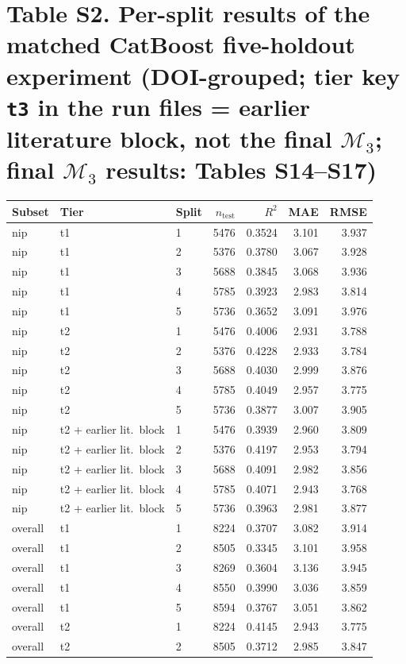 \documentclass[10pt]{article}
\begin{document}
\section*{Table S2. Per-split results of the matched CatBoost five-holdout experiment (DOI-grouped; tier key \texttt{t3} in the run files = earlier literature block, not the final $\mathcal{M}_3$; final $\mathcal{M}_3$ results: Tables S14--S17)}\begin{longtable}{lllrrrr}\toprule Subset & Tier & Split & $n_\mathrm{test}$ & $R^2$ & MAE & RMSE\\\midrule\endhead
nip & t1 & 1 & 5476 & 0.3524 & 3.101 & 3.937\\
nip & t1 & 2 & 5376 & 0.3780 & 3.067 & 3.928\\
nip & t1 & 3 & 5688 & 0.3845 & 3.068 & 3.936\\
nip & t1 & 4 & 5785 & 0.3923 & 2.983 & 3.814\\
nip & t1 & 5 & 5736 & 0.3652 & 3.091 & 3.976\\
nip & t2 & 1 & 5476 & 0.4006 & 2.931 & 3.788\\
nip & t2 & 2 & 5376 & 0.4228 & 2.933 & 3.784\\
nip & t2 & 3 & 5688 & 0.4030 & 2.999 & 3.876\\
nip & t2 & 4 & 5785 & 0.4049 & 2.957 & 3.775\\
nip & t2 & 5 & 5736 & 0.3877 & 3.007 & 3.905\\
nip & t2 + earlier lit.\ block & 1 & 5476 & 0.3939 & 2.960 & 3.809\\
nip & t2 + earlier lit.\ block & 2 & 5376 & 0.4197 & 2.953 & 3.794\\
nip & t2 + earlier lit.\ block & 3 & 5688 & 0.4091 & 2.982 & 3.856\\
nip & t2 + earlier lit.\ block & 4 & 5785 & 0.4071 & 2.943 & 3.768\\
nip & t2 + earlier lit.\ block & 5 & 5736 & 0.3963 & 2.981 & 3.877\\
overall & t1 & 1 & 8224 & 0.3707 & 3.082 & 3.914\\
overall & t1 & 2 & 8505 & 0.3345 & 3.101 & 3.958\\
overall & t1 & 3 & 8269 & 0.3604 & 3.136 & 3.945\\
overall & t1 & 4 & 8550 & 0.3990 & 3.036 & 3.859\\
overall & t1 & 5 & 8594 & 0.3767 & 3.051 & 3.862\\
overall & t2 & 1 & 8224 & 0.4145 & 2.943 & 3.775\\
overall & t2 & 2 & 8505 & 0.3712 & 2.985 & 3.847\\

\end{longtable}
\end{document}
